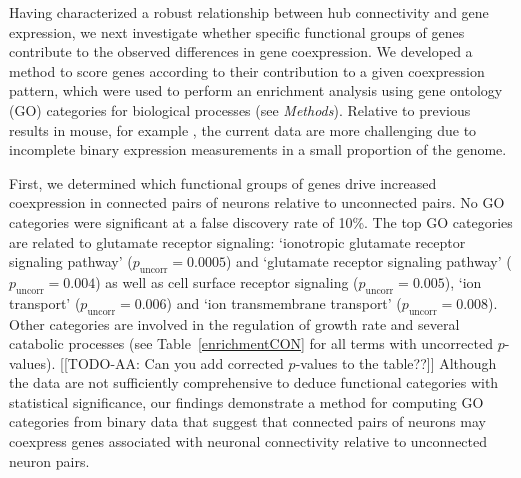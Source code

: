 \documentclass[10pt,letterpaper]{article}
\begin{document}
Having characterized a robust relationship between hub connectivity and gene expression, we next investigate whether specific functional groups of genes contribute to the observed differences in gene coexpression.
We developed a method to score genes according to their contribution to a given coexpression pattern, which were used to perform an enrichment analysis using gene ontology (GO) categories for biological processes \cite{Ashburner2000, Gillis2010} (see \emph{Methods}).
Relative to previous results in mouse, for example \cite{Fulcher:2016ck, Ji:2014jw, Fakhry:2015kl, French:2011cz}, the current data are more challenging due to incomplete binary expression measurements in a small proportion of the genome.

First, we determined which functional groups of genes drive increased coexpression in connected pairs of neurons relative to unconnected pairs.
No GO categories were significant at a false discovery rate of 10\%.
The top GO categories are related to glutamate receptor signaling: `ionotropic glutamate receptor signaling pathway' ($p_\mathrm{uncorr} = 0.0005$) and `glutamate receptor signaling pathway' ($p_\mathrm{uncorr} = 0.004$) as well as cell surface receptor signaling ($p_\mathrm{uncorr} = 0.005$), `ion transport' ($p_\mathrm{uncorr} = 0.006$) and `ion transmembrane transport' ($p_\mathrm{uncorr} = 0.008$).
Other categories are involved in the regulation of growth rate and several catabolic processes (see Table~\ref{enrichmentCON} for all terms with uncorrected $p$-values).
[[TODO-AA: Can you add corrected $p$-values to the table??]]
Although the data are not sufficiently comprehensive to deduce functional categories with statistical significance, our findings demonstrate a method for computing GO categories from binary data that suggest that connected pairs of neurons may coexpress genes associated with neuronal connectivity relative to unconnected neuron pairs.
\end{document}
